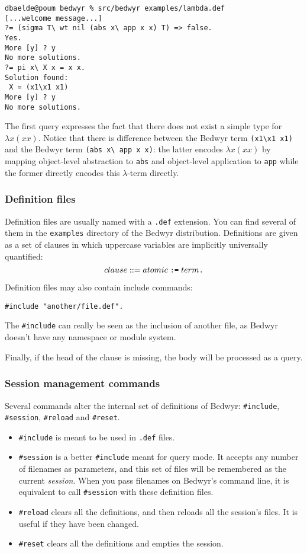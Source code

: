 \documentclass{article}
\begin{document}
\begin{verbatim}
dbaelde@poum bedwyr % src/bedwyr examples/lambda.def
[...welcome message...]
?= (sigma T\ wt nil (abs x\ app x x) T) => false.
Yes.
More [y] ? y
No more solutions.
?= pi x\ X x = x x.
Solution found:
 X = (x1\x1 x1)
More [y] ? y
No more solutions.
\end{verbatim}
The first query expresses the fact that there does not exist a simple
type for $\lambda x (x x)$.  Notice that there is difference between
the Bedwyr term \verb+(x1\x1 x1)+ and the Bedwyr term
\verb+(abs x\ app x x)+: the latter encodes $\lambda x (x x)$ by
mapping object-level abstraction to {\tt abs} and object-level
application to {\tt app} while the former directly encodes this
$\lambda$-term directly.


\subsubsection{Definition files}

Definition files are usually named with a \verb|.def| extension.
You can find several of them in the \verb.examples. directory
of the Bedwyr distribution.
Definitions are given as a set of clauses in which uppercase
variables are implicitly universally quantified:
\[ clause ::= atomic \;\verb.:=.\; term \verb|.| \]

Definition files may also contain include commands:
\begin{verbatim}#include "another/file.def".\end{verbatim}
The \verb.#include. can really be seen as the inclusion of another file,
as Bedwyr doesn't have any namespace or module system.

Finally, if the head of the clause is missing, the body will be processed as a
query.

\subsubsection{Session management commands}

Several commands alter the internal set of definitions of Bedwyr:
\verb.#include., \verb.#session., \verb.#reload. and \verb.#reset..
\begin{itemize}
  \item
    \verb.#include. is meant to be used in \verb;.def; files.
  \item
    \verb.#session. is a better \verb.#include. meant for query mode.
    It accepts any number of filenames as parameters, and this set of files
    will be remembered as the current \emph{session}.
    When you pass filenames on Bedwyr's command line,
    it is equivalent to call \verb.#session. with these definition files.
  \item
    \verb.#reload. clears all the definitions,
    and then reloads all the session's files. It is useful if they have
    been changed.
  \item
    \verb.#reset. clears all the definitions and empties the session.
\end{itemize}
\end{document}
